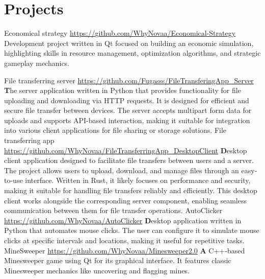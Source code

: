 \documentclass[11pt,a4paper]{moderncv}
\begin{document}
\maketitle
\section{Projects}
  \cvline
    {Economical strategy}
    {\url{https://github.com/WhyNovaa/Economical-Strategy}\newline{}
    \textbfgame Development project written in Qt focused on building an economic simulation, highlighting skills in resource management, optimization algorithms, and strategic gameplay mechanics.\newline{}
    }

  \cvline
    {File transferring server}
    {\url{https://github.com/Fugasss/FileTransferingApp_Server}\newline{}
    \textbf
    The server application written in Python that provides functionality for file uploading and downloading via HTTP requests. It is designed for efficient and secure file transfer between devices. The server accepts multipart form data for uploads and supports API-based interaction, making it suitable for integration into various client applications for file sharing or storage solutions.\newline{}
    }
  \cvline
    {File transferring app}
    {\url{https://github.com/WhyNovaa/FileTransferringApp_DesktopClient}\newline{}
    \textbf
    Desktop client application designed to facilitate file transfers between users and a server. The project allows users to upload, download, and manage files through an easy-to-use interface. Written in Rust, it likely focuses on performance and security, making it suitable for handling file transfers reliably and efficiently. This desktop client works alongside the corresponding server component, enabling seamless communication between them for file transfer operations.\newline{}
    }
  \cvline 
    {AutoClicker}
    {\url{https://github.com/WhyNovaa/AutoClicker}\newline{}
    \textbf Desktop application written in Python that automates mouse clicks. The user can configure it to simulate mouse clicks at specific intervals and locations, making it useful for repetitive tasks.\newline{}
    }
  \cvline
    {MineSweeper}
    {\url{https://github.com/WhyNovaa/Minesweeper2.0}\newline{}
    \textbf A C++-based Minesweeper game using Qt for its graphical interface. It features classic Minesweeper mechanics like uncovering and flagging mines.
    }
    
\end{document}
